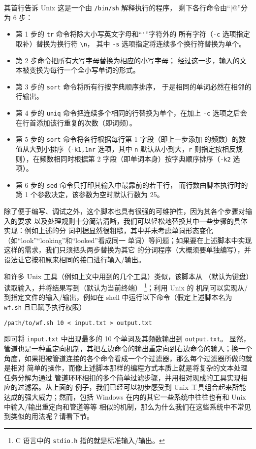 其首行告诉 Unix 这是一个由 \verb|/bin/sh| 解释执行的程序，
剩下各行命令由“\verb@|@”分为 6 步：
\begin{itemize}
\item 第 1 步的 \verb|tr| 命令将除大小写英文字母和“\verb|'|”字符外的
	所有字符（\verb|-c| 选项指定取补）替换为换行符 \verb|\n|，
	其中 \verb|-s| 选项指定将连续多个换行符替换为单个。
\item 第 2 步命令把所有大写字母替换为相应的小写字母；
	经过这一步，输入的文本被变换为每行一个全小写单词的形式。
\item 第 3 步的 \verb|sort| 命令将所有行按字典顺序排序，
	于是相同的单词必然在相邻的行输出。
\item 第 4 步的 \verb|uniq| 命令把连续多个相同的行替换为单个，在加上
	\verb|-c| 选项之后会在行首添加该行重复的次数（即词频）。
\item 第 5 步的 \verb|sort| 命令将各行根据每行第 1 字段（即上一步添加
	的频数）的数值从大到小排序（\verb|-k1,1nr| 选项，其中 \verb|n|
	默认从小到大，\verb|r| 则指定按相反规则），在频数相同时根据第
	2 字段（即单词本身）按字典顺序排序（\verb|-k2| 选项）。
\item 第 6 步的 \verb|sed| 命令只打印其输入中最靠前的若干行，
	而行数由脚本执行时的第 1 个参数决定，该参数为空时默认行数为 25。
\end{itemize}
除了便于编写、调试之外，这个脚本也具有很强的可维护性，因为其各个步骤对输入的要求
以及处理规则十分简洁清晰，我们可以轻松地替换其中一些步骤的具体实现：例如上述的分
词判据显然很粗糙，其中并未考虑单词形态变化（如“look”“looking”和“looked”看成同一
单词）等问题；如果要在上述脚本中实现这样的需求，我们只须把头两步替换为其它
的分词程序（大概须要单独编写），并设法让它按和原来相同的接口进行输入/输出。

和许多 Unix 工具（例如上文中用到的几个工具）类似，该脚本从%
（默认为键盘）读取输入，并将结果写到（默认为当前终端）%
\footnote{C 语言中的 \texttt{stdio.h} 指的就是标准输入/输出。}；利用 Unix 的%
机制可以实现从/到指定文件的输入/输出，例如在 shell
中运行以下命令（假定上述脚本名为 \verb|wf.sh| 且已赋予执行权限）
\begin{quoting}
\begin{Verbatim}
/path/to/wf.sh 10 < input.txt > output.txt
\end{Verbatim}
\end{quoting}
即可将 \verb|input.txt| 中出现最多的 10 个单词及其频数输出到 \verb|output.txt|。
显然，管道也是一种重定向机制，其把左边命令的输出重定向到右边命令的输入；换一个
角度，如果把被管道连接的各个命令看成一个个过滤器，那么每个过滤器所做的就是相对
简单的操作，而像上述脚本那样的编程方式本质上就是将复杂的文本处理任务分解为通过
管道环环相扣的多个简单过滤步骤，并用相对现成的工具实现相应的过滤器。从上面的
例子，我们已经可以初步感受到 Unix 工具组合起来所能达成的强大威力；然而，包括
Windows 在内的其它一些系统中往往也有和 Unix 中输入/输出重定向和管道等等
相似的机制，那么为什么我们在这些系统中不常见到类似的用法呢？请看下节。

